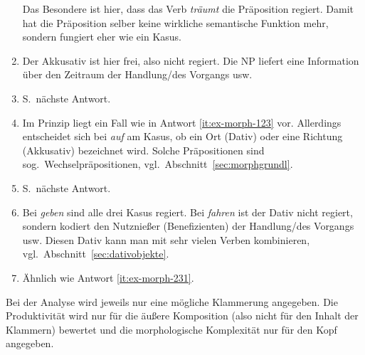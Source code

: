 \begin{enumerate}
    Das Besondere ist hier, dass das Verb \textit{träumt} die Präposition regiert.
    Damit hat die Präposition selber keine wirkliche semantische Funktion mehr, sondern fungiert eher wie ein Kasus.
  \item \label{it:ex-morph-231} Der Akkusativ ist hier frei, also nicht regiert.
    Die NP liefert eine Information über den Zeitraum der Handlung/des Vorgangs usw.
  \item S.\ nächste Antwort.
  \item Im Prinzip liegt ein Fall wie in Antwort \ref{it:ex-morph-123} vor.
    Allerdings entscheidet sich bei \textit{auf} am Kasus, ob ein Ort (Dativ) oder eine Richtung (Akkusativ) bezeichnet wird.
    Solche Präpositionen sind sog.\ Wechselpräpositionen, vgl.\ Abschnitt~\ref{sec:morphgrundl}.
  \item S.\ nächste Antwort.
  \item Bei \textit{geben} sind alle drei Kasus regiert.
    Bei \textit{fahren} ist der Dativ nicht regiert, sondern kodiert den Nutznießer (Benefizienten) der Handlung/des Vorgangs usw.
    Diesen Dativ kann man mit sehr vielen Verben kombinieren, vgl.\ Abschnitt~\ref{sec:dativobjekte}.
  \item Ähnlich wie Antwort \ref{it:ex-morph-231}. 
\end{enumerate}



Bei der Analyse wird jeweils nur eine mögliche Klammerung angegeben.
Die Produktivität wird nur für die äußere Komposition (also nicht für den Inhalt der Klammern) bewertet und die morphologische Komplexität nur für den Kopf angegeben.

